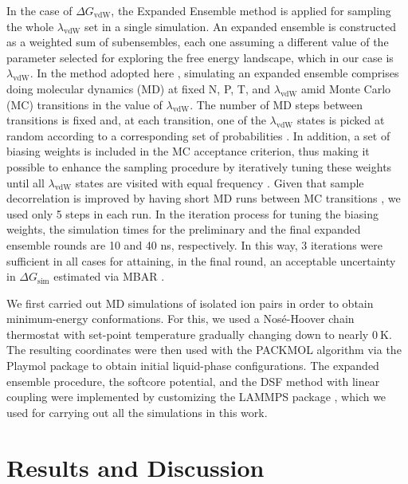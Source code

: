 \documentclass[3p,twocolumn]{elsarticle}
\begin{document}
In the case of $\Delta G_\text{vdW}$, the Expanded Ensemble method \cite{Lyubartsev_1992} is applied for sampling the whole $\lambda_\text{vdW}$ set in a single simulation.
An expanded ensemble is constructed as a weighted sum of subensembles, each one assuming a different value of the parameter selected for exploring the free energy landscape, which in our case is $\lambda_\text{vdW}$.
In the method adopted here \cite{Chodera_2011_2}, simulating an expanded ensemble comprises doing molecular dynamics (MD) at fixed N, P, T, and $\lambda_\text{vdW}$ amid Monte Carlo (MC) transitions in the value of $\lambda_\text{vdW}$.
The number of MD steps between transitions is fixed and, at each transition, one of the $\lambda_\text{vdW}$ states is picked at random according to a corresponding set of probabilities \cite{Chodera_2011_2}.
In addition, a set of biasing weights is included in the MC acceptance criterion, thus making it possible to enhance the sampling procedure by iteratively tuning these weights until all $\lambda_\text{vdW}$ states are visited with equal frequency \cite{Lyubartsev_1992}.
Given that sample decorrelation is improved by having short MD runs between MC transitions \cite{Chodera_2011_2}, we used only 5 steps in each run.
In the iteration process for tuning the biasing weights, the simulation times for the preliminary and the final expanded ensemble rounds are 10 and 40 ns, respectively.
In this way, 3 iterations were sufficient in all cases for attaining, in the final round, an acceptable uncertainty in $\Delta G_\text{sim}$ estimated via MBAR \cite{Shirts_2008, Klimovich_2015}.

We first carried out MD simulations of isolated ion pairs in order to obtain minimum-energy conformations.
For this, we used a Nos\'{e}-Hoover chain thermostat \cite{Martyna1992} with set-point temperature gradually changing down to nearly $0~\text{K}$.
The resulting coordinates were then used with the PACKMOL algorithm \cite{Mart_nez_2009} via the Playmol package \cite{playmol} to obtain initial liquid-phase configurations.
The expanded ensemble procedure, the softcore potential, and the DSF method  with linear coupling were implemented by customizing the LAMMPS package \cite{Plimpton1995}, which we used for carrying out all the simulations in this work.

\section{Results and Discussion}
\label{sec:results}
\end{document}
